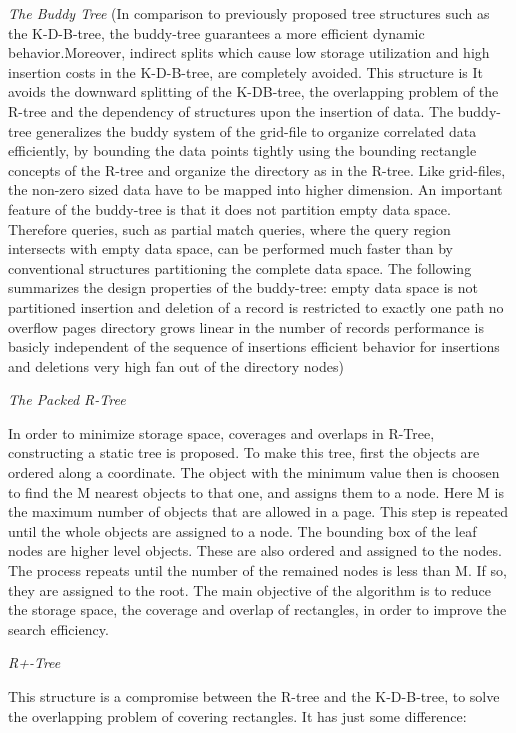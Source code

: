 \documentclass[a4paper,12pt]{article}
\begin{document}
\emph{The Buddy Tree}
(In comparison to previously proposed tree structures such as the K-D-B-tree, the buddy-tree guarantees a more efficient dynamic behavior.Moreover, indirect splits which cause low storage utilization and high insertion costs in the K-D-B-tree, are completely avoided. This structure is 
It avoids the downward splitting of the K-DB-tree, the overlapping problem of the R-tree and the dependency of structures upon the insertion of data. The buddy-tree generalizes the buddy system of the grid-file to organize correlated data efficiently, by bounding the data points tightly using the bounding rectangle concepts of the R-tree and organize the directory as in the R-tree. Like grid-files, the non-zero sized data have to be mapped into higher dimension.
An important feature of the buddy-tree is that it does not partition empty data space. Therefore queries, such as partial match queries, where the query region intersects with empty data space, can be performed much faster than by conventional structures partitioning the complete data space.
The following summarizes the design properties of the buddy-tree:
empty data space is not partitioned
insertion and deletion of a record is restricted to
exactly one path
no overflow pages
directory grows linear in the number of records
performance is basicly independent of the sequence of
insertions
efficient behavior for insertions and deletions
very high fan out of the directory nodes)

\emph{The Packed R-Tree}

In order to minimize storage space, coverages and overlaps in R-Tree, constructing a static tree is proposed. To make this tree, first the objects are ordered along a coordinate. The object with the minimum value then is choosen to find the M nearest objects to that one, and assigns them to a node. Here M is the maximum number of objects that are allowed in a page. This step is repeated until the whole objects are assigned to a node. The bounding box of the leaf nodes are higher level objects. These are also ordered and assigned to the nodes. The process repeats until the number of the remained nodes is less than M. If so, they are assigned to the root.
The main objective of the algorithm is to reduce the storage space, the coverage and overlap of rectangles, in order to improve the search efficiency.

\emph{R+-Tree}

This structure is a compromise between the R-tree and the K-D-B-tree, to solve the overlapping problem of covering rectangles. It has just some difference:
\end{document}
